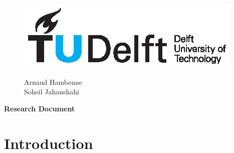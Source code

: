 \documentclass[11pt]{article}
\begin{document}
\thispagestyle{fancy}
\begin{figure}
    \begin{minipage}[H]{0.33\textwidth}
		\vspace{0.3cm}
		\includegraphics[scale=0.8]{img/TUDelftLogo.eps}
	\end{minipage}
	\begin{minipage}[H]{0.34\textwidth}
		\begin{center}
			\selectfont \textcolor{blue}{}
		\end{center}
		
	
	\end{minipage}
	\begin{minipage}[H]{0.33\textwidth}
			\begin{flushright}

				\small{Arnaud Hambenne }\\
				\small{Soheil Jahanshahi }\\
				

			\end{flushright}
			
	\end{minipage}
\end{figure}


\begin{minipage}[H]{\textwidth}
\vspace{0.3cm}
		\begin{center}
		
		\vspace{0.3cm}
			\Large{\selectfont \textbf{Research Document}}\\
		\vspace{0.3cm}	
		
		\vspace{0.7cm}	
		\end{center}
	\end{minipage}
\section{Introduction}
  
\end{document}
